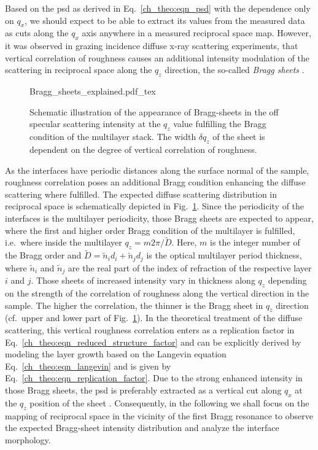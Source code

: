 Based on the \gls{psd} as derived in Eq.~\eqref{ch_theo:eqn_psd} with the dependence only on $q_x$, we should expect to be able to extract its values from the measured data as cuts along the $q_x$ axis anywhere in a measured reciprocal space map. However, it was observed in grazing incidence diffuse x-ray scattering experiments, that vertical correlation of roughness causes an additional intensity modulation of the scattering in reciprocal space along the $q_z$ direction, the so-called \emph{Bragg sheets} \cite{jiang_nonspecular_1992, holy_nonspecular_1994, salditt_kinetic_1994, holy_interface_1995}.
\begin{figure}[htb]
    \def\svgwidth{\textwidth}
    {Bragg_sheets_explained.pdf_tex}
    \caption{Schematic illustration of the appearance of Bragg-sheets in the off specular scattering intensity at the $q_z$ value fulfilling the Bragg condition of the multilayer stack. The width $\delta q_z$ of the sheet is dependent on the degree of vertical correlation of roughness.}
    \label{ch_diff:fig_Bragg_sheets_explained} 
\end{figure}
As the interfaces have periodic distances along the surface normal of the sample, roughness correlation poses an additional Bragg condition enhancing the diffuse scattering where fulfilled. The expected diffuse scattering distribution in reciprocal space is schematically depicted in Fig.~\ref{ch_diff:fig_Bragg_sheets_explained}. Since the periodicity of the interfaces is the multilayer periodicity, those Bragg sheets are expected to appear, where the first and higher order Bragg condition of the multilayer is fulfilled, i.e.~where inside the multilayer $q_z=m 2 \pi /\tilde{D}$. Here, $m$ is the integer number of the Bragg order and $\tilde{D} = \tilde{n}_i d_i + \tilde{n}_j d_j$ is the optical multilayer period thickness, where $\tilde{n}_i$ and $\tilde{n}_j$ are the real part of the index of refraction of the respective layer $i$ and $j$. Those sheets of increased intensity vary in thickness along $q_z$ depending on the strength of the correlation of roughness along the vertical direction in the sample. The higher the correlation, the thinner is the Bragg sheet in $q_z$ direction (cf.~upper and lower part of Fig.~\ref{ch_diff:fig_Bragg_sheets_explained}). In the theoretical treatment of the diffuse scattering, this vertical roughness correlation enters as a replication factor in Eq.~\eqref{ch_theo:eqn_reduced_structure_factor} and can be explicitly derived by modeling the layer growth based on the Langevin equation Eq.~\eqref{ch_theo:eqn_langevin} and is given by Eq.~\eqref{ch_theo:eqn_replication_factor}. Due to the strong enhanced intensity in those Bragg sheets, the \gls{psd} is preferably extracted as a vertical cut along $q_x$ at the $q_z$ position of the sheet \cite{salditt_kinetic_1994,siffalovic_characterization_2009}. Consequently, in the following we shall focus on the mapping of reciprocal space in the vicinity of the first Bragg resonance to observe the expected Bragg-sheet intensity distribution and analyze the interface morphology.

